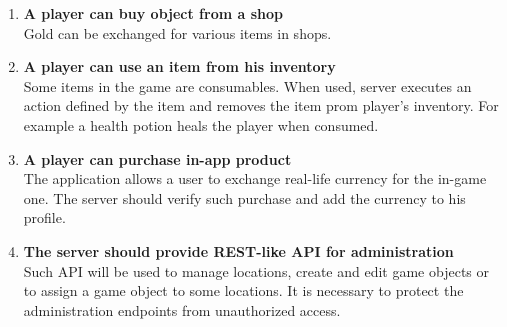 \begin{enumerate}
			\item \textbf{A player can buy object from a shop} \\
			Gold can be exchanged for various items in shops.
			
			\item \textbf{A player can use an item from his inventory} \\
			Some items in the game are consumables. When used, server executes an action defined by the item and removes the item prom player's inventory. For example a health potion heals the player when consumed.
			
			\item \textbf{A player can purchase in-app product} \\
			The application allows a user to exchange real-life currency for the in-game one. The server should verify such purchase and add the currency to his profile.
			
			\item \textbf{The server should provide REST-like API for administration} \\	
			Such API will be used to manage locations, create and edit game objects or to assign a game object to some locations. It is necessary to protect the administration endpoints from unauthorized access.
			
		\end{enumerate}
		
		
